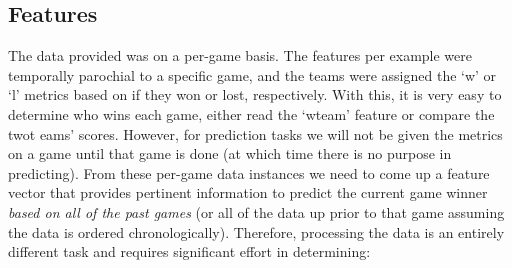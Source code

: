 \documentclass{article} %
\begin{document}
\subsection{Features}
\label{sec:data-features}

The data provided was on a per-game basis.  The features per example were temporally parochial to a specific game, and the teams were assigned the `w' or `l' metrics based on if they won or lost, respectively.  With this, it is very easy to determine who wins each game, either read the `wteam' feature or compare the twot eams' scores.  However, for prediction tasks we will not be given the metrics on a game until that game is done (at which time there is no purpose in predicting).  From these per-game data instances we need to come up a feature vector that provides pertinent information to predict the current game winner \textit{based on all of the past games} (or all of the data up prior to that game assuming the data is ordered chronologically).  Therefore, processing the data is an entirely different task and requires significant effort in determining:
\end{document}
